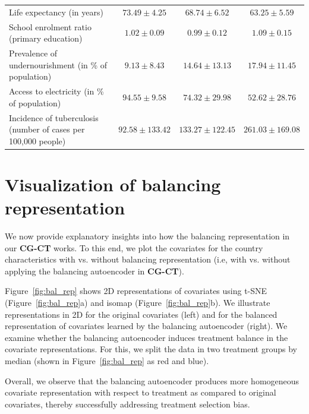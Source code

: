 \documentclass[sigconf]{acmart}
\newcommand{\framework}{\textbf{\mbox{CG-CT}}\xspace}
\begin{document}
\begin{table}[H]
\begin{center}
{\begin{tabular}{l ccc}
\thinmuskip Life expectancy (in years)  & $73.49 \pm 4.25$ & $68.74 \pm 6.52$ & $63.25 \pm 5.59$ \\
\thinmuskip School enrolment ratio (primary education)  & $1.02 \pm 0.09$ & $0.99 \pm 0.12$ & $1.09 \pm 0.15$ \\
\thinmuskip Prevalence of undernourishment (in \% of population)  & $9.13 \pm 8.43$ & $14.64 \pm 13.13$ & $17.94 \pm 11.45$ \\
\thinmuskip Access to electricity (in \% of population)  & $94.55 \pm 9.58$ & $74.32 \pm 29.98$ & $52.62 \pm 28.76$ \\
\thinmuskip Incidence of tuberculosis (number of cases per 100,000 people)  & $92.58 \pm 133.42$ & $133.27 \pm 122.45$ & $261.03 \pm 169.08$ \\
\hline \hline
\end{tabular}
}
\end{center}
\end{table}

\newpage 

\section{Visualization of balancing representation}
\label{supp:balance_rep} %

We now provide explanatory insights into how the balancing representation in our \framework works. To this end, we plot the covariates for the country characteristics with vs. without balancing representation (i.e, with vs. without applying the balancing autoencoder in \framework). 

Figure~\ref{fig:bal_rep} shows 2D representations of covariates using t-SNE \cite{Maaten2008} (Figure~\ref{fig:bal_rep}a) and isomap \cite{Tanenbaum2000} (Figure~\ref{fig:bal_rep}b). We illustrate representations in 2D for the original covariates (left) and for the balanced representation of covariates learned by the balancing autoencoder (right). We examine whether the balancing autoencoder induces treatment balance in the covariate representations. For this, we split the data in two treatment groups by median (shown in Figure~\ref{fig:bal_rep} as red and blue). 

Overall, we observe that the balancing autoencoder produces more homogeneous covariate representation with respect to treatment as compared to original covariates, thereby successfully addressing treatment selection bias.
\end{document}

